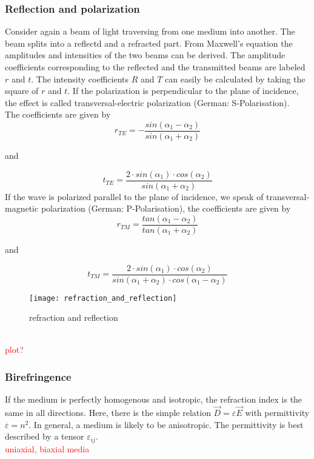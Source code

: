 \subsubsection{Reflection and polarization}
Consider again a beam of light traversing from one medium into another.
The beam splits into a reflectd and a refracted part.
From Maxwell's equation the amplitudes and intensities of the two beams
can be derived. The amplitude coefficients corresponding to the reflected and
the transmitted beams are labeled $r$ and $t$. The intensity coefficients
$R$ and $T$ can easily be calculated by taking the square of $r$ and $t$.
If the polarization is perpendicular to the plane of incidence,
the effect is called transversal-electric polarization (German:
S-Polarisation). \\ The coefficients are given by
\begin{equation}
    r_{TE}=-\frac{sin(\alpha_1-\alpha_2)}{sin(\alpha_1+\alpha_2)}
\end{equation}\begin{center}and\end{center}
\begin{equation}
    t_{TE}=\frac{2\cdot sin(\alpha_1)\cdot
    cos(\alpha_2)}{sin(\alpha_1+\alpha_2)}
\end{equation}
If the wave is polarized parallel to the plane of incidence, we speak of
transversal-magnetic polarization (German: P-Polarisation), the coefficients
are given by
\begin{equation}
    r_{TM}=\frac{tan(\alpha_1-\alpha_2)}{tan(\alpha_1+\alpha_2)}
\end{equation}\begin{center}and\end{center}
\begin{equation}
    t_{TM}=\frac{2\cdot sin(\alpha_1)\cdot
    cos(\alpha_2)}{sin(\alpha_1+\alpha_2)\cdot
    cos(\alpha_1-\alpha_2)}
\end{equation}
\begin{figure}[h!]
    \centering
    \texttt{[image: refraction\_and\_reflection]}
    \caption{refraction and reflection}
    \label{refraction_and_reflection}
\end{figure} \\ \textcolor{red}{plot?}

\newpage
\subsubsection{Birefringence}
If the medium is perfectly homogenous and isotropic, the refraction index
is the same in all directions. Here, there is the simple relation
$\vec D=\varepsilon\vec E$ with permittivity $\varepsilon=n^2$.
In general, a medium is likely to be anisotropic. The permittivity
is best described by a tensor $\varepsilon_{ij}$. \\
\textcolor{red}{uniaxial, biaxial media}

